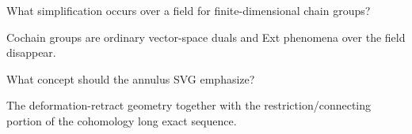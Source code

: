 \begin{problem}\label{prob:viii28-19}
What simplification occurs over a field for finite-dimensional chain groups?
\end{problem}
\begin{solution}
Cochain groups are ordinary vector-space duals and Ext phenomena over the field disappear.
\end{solution}

\begin{problem}\label{prob:viii28-20}
What concept should the annulus SVG emphasize?
\end{problem}
\begin{solution}
The deformation-retract geometry together with the restriction/connecting portion of the cohomology long exact sequence.
\end{solution}
